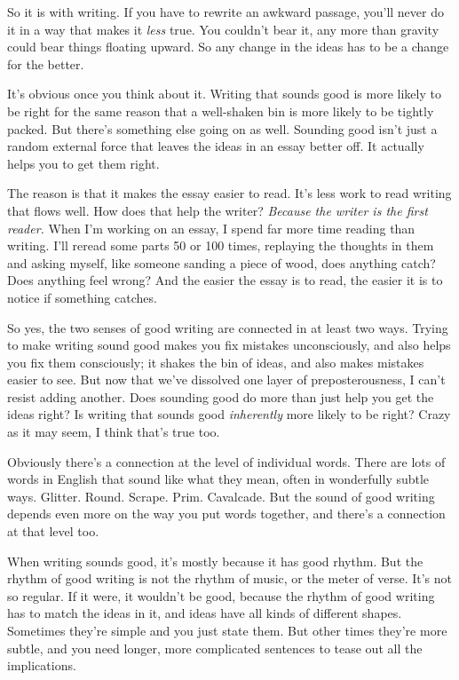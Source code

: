 So it is with writing. If you have to rewrite an awkward passage, you'll
never do it in a way that makes it \emph{less} true. You couldn't bear
it, any more than gravity could bear things floating upward. So any
change in the ideas has to be a change for the better.

It's obvious once you think about it. Writing that sounds good is more
likely to be right for the same reason that a well-shaken bin is more
likely to be tightly packed. But there's something else going on as
well. Sounding good isn't just a random external force that leaves the
ideas in an essay better off. It actually helps you to get them right.

The reason is that it makes the essay easier to read. It's less work to
read writing that flows well. How does that help the writer?
\emph{Because the writer is the first reader.} When I'm working on an
essay, I spend far more time reading than writing. I'll reread some
parts 50 or 100 times, replaying the thoughts in them and asking myself,
like someone sanding a piece of wood, does anything catch? Does anything
feel wrong? And the easier the essay is to read, the easier it is to
notice if something catches.

So yes, the two senses of good writing are connected in at least two
ways. Trying to make writing sound good makes you fix mistakes
unconsciously, and also helps you fix them consciously; it shakes the
bin of ideas, and also makes mistakes easier to see. But now that we've
dissolved one layer of preposterousness, I can't resist adding another.
Does sounding good do more than just help you get the ideas right? Is
writing that sounds good \emph{inherently} more likely to be right?
Crazy as it may seem, I think that's true too.

Obviously there's a connection at the level of individual words. There
are lots of words in English that sound like what they mean, often in
wonderfully subtle ways. Glitter. Round. Scrape. Prim. Cavalcade. But
the sound of good writing depends even more on the way you put words
together, and there's a connection at that level too.

When writing sounds good, it's mostly because it has good rhythm. But
the rhythm of good writing is not the rhythm of music, or the meter of
verse. It's not so regular. If it were, it wouldn't be good, because the
rhythm of good writing has to match the ideas in it, and ideas have all
kinds of different shapes. Sometimes they're simple and you just state
them. But other times they're more subtle, and you need longer, more
complicated sentences to tease out all the implications.

